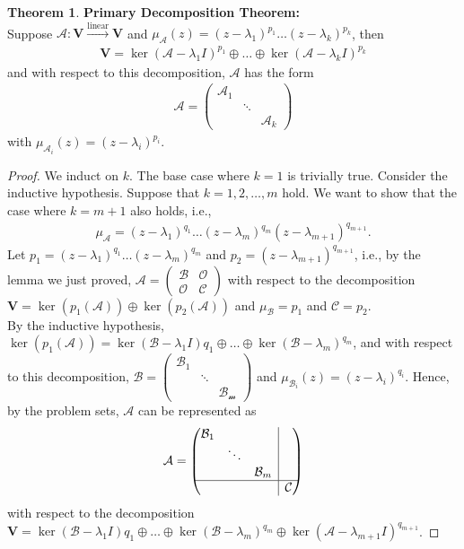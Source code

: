 \documentclass{article}
\theoremstyle{definition}
\newtheorem{thm}{Theorem}[section]
\newcommand{\V}{\mathbf{V}}
\newcommand{\A}{\mathcal{A}}
\newcommand{\lin}{\overset{\text{linear}}{\longrightarrow}}
\newcommand{\rvline}{\hspace*{-\arraycolsep}\vline\hspace*{-\arraycolsep}}
\begin{document}
\begin{thm}
	\textbf{Primary Decomposition Theorem:}\\ Suppose $\A : \V \lin \V$ and $\mu_\A(z) = (z-\lambda_1)^{p_1}\dots (z-\lambda_k)^{p_k}$, then 
	\begin{align*}
	\V = \ker(\A - \lambda_1 I )^{p_1} \oplus \dots \oplus \ker(\A - \lambda_k I)^{p_k}
	\end{align*}
	and with respect to this decomposition, $\A$ has the form
	\begin{align*}
	\A = \begin{pmatrix}
	\A_1 & & \\
	& \ddots &\\
	& & \A_k 
	\end{pmatrix}
	\end{align*}
	with $\mu_{\A_i}(z) = (z - \lambda_i)^{p_i}$.
	
	
	\begin{proof}
		We induct on $k$. The base case where $k=1$ is trivially true. Consider the inductive hypothesis. Suppose that $k=1,2,\dots,m$ hold. We want to show that the case where $k = m+1$ also holds, i.e., 
		\begin{align*}
		\mu_\A = (z- \lambda_1)^{q_1}\dots (z - \lambda_m)^{q_m}(z - \lambda_{m+1})^{q_{m+1}}.
		\end{align*}
		Let $p_1 = (z- \lambda_1)^{q_1}\dots (z - \lambda_m)^{q_m}$ and $p_2 = (z - \lambda_{m+1})^{q_{m+1}}$, i.e., by the lemma we just proved, $\A = \begin{pmatrix}
		\mathcal{B} & \mathcal{O}\\
		\mathcal{O} & \mathcal{C}
		\end{pmatrix}$ with respect to the decomposition $\V = \ker(p_1(\A)) \oplus \ker(p_2(\A))$ and $\mu_\mathcal{B} = p_1$ and $\mathcal{C} = p_2$. \\
		
		By the inductive hypothesis, $\ker(p_1(\A)) = \ker(\mathcal{B} - \lambda_1 I){q_1} \oplus \dots \oplus \ker(\mathcal{B} - \lambda_m)^{q_m}$, and with respect to this decomposition, $\mathcal{B} = \begin{pmatrix}
		\mathcal{B}_1 & & \\
		&\ddots&\\
		&&\mathcal{B_m}
		\end{pmatrix}$ and $\mu_{\mathcal{B}_i}(z) = (z - \lambda_i)^{q_i}$. Hence, by the problem sets, $\A$ can be represented as
		\begin{align*}
		\A = 
		\begin{pmatrix}
		\begin{matrix}
		\mathcal{B}_1 & &\\
		& \ddots &\\
		& & \mathcal{B}_m
		\end{matrix}& \rvline & \\
		\hline
		& \rvline & \mathcal{C}
		\end{pmatrix}
		\end{align*}
		with respect to the decomposition $\V = \ker(\mathcal{B} - \lambda_1 I){q_1} \oplus \dots \oplus \ker(\mathcal{B} - \lambda_m)^{q_m} \oplus \ker(\A - \lambda_{m+1} I )^{q_{m+1}}$.
		

\end{proof}
\end{thm}
\end{document}
